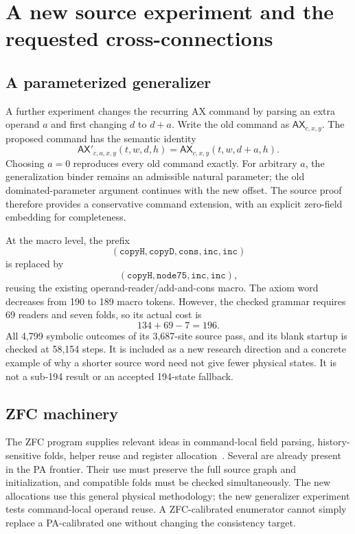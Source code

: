 \documentclass[11pt,letterpaper]{article}
\begin{document}
\section{A new source experiment and the requested cross-connections}
\subsection{A parameterized generalizer}

A further experiment changes the recurring AX command by parsing an extra operand $a$ and first changing $d$ to $d+a$. Write the old command as $\mathsf{AX}_{c,x,y}$. The proposed command has the semantic identity
\[
 \mathsf{AX}'_{c,a,x,y}(t,w,d,h)
       =\mathsf{AX}_{c,x,y}(t,w,d+a,h).
\]
Choosing $a=0$ reproduces every old command exactly. For arbitrary $a$, the generalization binder remains an admissible natural parameter; the old dominated-parameter argument continues with the new offset. The source proof therefore provides a conservative command extension, with an explicit zero-field embedding for completeness.

At the macro level, the prefix
\[
 (\texttt{copyH},\texttt{copyD},\texttt{cons},\texttt{inc},\texttt{inc})
\]
is replaced by
\[
 (\texttt{copyH},\texttt{node75},\texttt{inc},\texttt{inc}),
\]
reusing the existing operand-reader/add-and-cons macro. The axiom word decreases from 190 to 189 macro tokens. However, the checked grammar requires 69 readers and seven folds, so its actual cost is
\[
             134+69-7=196.
\]
All 4,799 symbolic outcomes of its 3,687-site source pass, and its blank startup is checked at 58,154 steps. It is included as a new research direction and a concrete example of why a shorter source word need not give fewer physical states. It is not a sub-194 result or an accepted 194-state fallback.

\subsection{ZFC machinery}

The ZFC program supplies relevant ideas in command-local field parsing, history-sensitive folds, helper reuse and register allocation~\cite{zfc}. Several are already present in the PA frontier. Their use must preserve the full source graph and initialization, and compatible folds must be checked simultaneously. The new allocations use this general physical methodology; the new generalizer experiment tests command-local operand reuse. A ZFC-calibrated enumerator cannot simply replace a PA-calibrated one without changing the consistency target.
\end{document}

